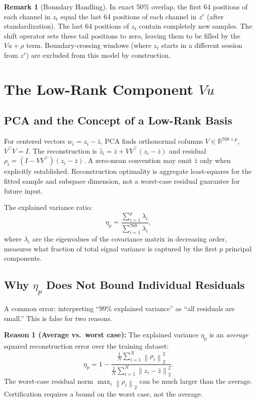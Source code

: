\documentclass[11pt, a4paper]{article}
\theoremstyle{definition}
\newtheorem{remark}{Remark}[section]
\theoremstyle{plain}
\newcommand{\norm}[2]{\left\|#1\right\|_{#2}}
\begin{document}
\begin{remark}[Boundary Handling]
  In exact 50\% overlap, the first 64 positions of each channel in $z_t$ equal the
  last 64 positions of each channel in $z^r$ (after standardization). The last 64
  positions of $z_t$ contain completely new samples. The shift operator sets these
  tail positions to zero, leaving them to be filled by the $Vu + \rho$ term.
  Boundary-crossing windows (where $z_t$ starts in a different session from $z^r$)
  are excluded from this model by construction.
\end{remark}

\section{The Low-Rank Component $Vu$}

\subsection{PCA and the Concept of a Low-Rank Basis}

For centered vectors $w_i=z_i-\bar z$, PCA finds orthonormal columns
$V\in\mathbb R^{768\times p}$, $V^\top V=I$. The reconstruction is
$\hat z_i=\bar z+VV^\top(z_i-\bar z)$ and residual
$\rho_i=(I-VV^\top)(z_i-\bar z)$. A zero-mean convention may omit $\bar z$
only when explicitly established. Reconstruction optimality is aggregate
least-squares for the fitted sample and subspace dimension, not a worst-case
residual guarantee for future input.

The explained variance ratio:
\[
  \eta_p = \frac{\sum_{i=1}^p \lambda_i}{\sum_{i=1}^{768} \lambda_i},
\]
where $\lambda_i$ are the eigenvalues of the covariance matrix in decreasing order,
measures what fraction of total signal variance is captured by the first $p$
principal components.

\subsection{Why $\eta_p$ Does Not Bound Individual Residuals}

A common error: interpreting ``99\% explained variance'' as ``all residuals are small.''
This is false for two reasons.

\textbf{Reason 1 (Average vs.\ worst case):} The explained variance $\eta_p$ is an
\emph{average} squared reconstruction error over the training dataset:
\[
  \eta_p = 1 - \frac{\frac{1}{N} \sum_{i=1}^N \norm{\rho_i}{2}^2}{\frac{1}{N}\sum_{i=1}^N \norm{z_i-\bar z}{2}^2}.
\]
The worst-case residual norm $\max_i \norm{\rho_i}{2}$ can be much larger than the
average. Certification requires a bound on the worst case, not the average.
\end{document}
